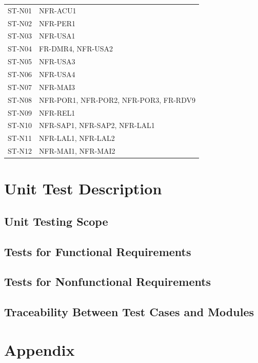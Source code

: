 \documentclass[12pt, titlepage]{article}
\begin{document}
\begin{longtable}{@{}p{}p{}@{}}
\midrule

ST-N01 & NFR-ACU1 \\
ST-N02 & NFR-PER1 \\
ST-N03 & NFR-USA1 \\
ST-N04 & FR-DMR4, NFR-USA2 \\
ST-N05 & NFR-USA3 \\
ST-N06 & NFR-USA4 \\
ST-N07 & NFR-MAI3 \\
ST-N08 & NFR-POR1, NFR-POR2, NFR-POR3, FR-RDV9 \\
ST-N09 & NFR-REL1 \\
ST-N10 & NFR-SAP1, NFR-SAP2, NFR-LAL1 \\
ST-N11 & NFR-LAL1, NFR-LAL2 \\
ST-N12 & NFR-MAI1, NFR-MAI2 \\

\end{longtable}

\section{Unit Test Description}

\subsection{Unit Testing Scope}

\subsection{Tests for Functional Requirements}

\subsection{Tests for Nonfunctional Requirements}

\subsection{Traceability Between Test Cases and Modules}





\newpage

\section{Appendix}
\end{document}
